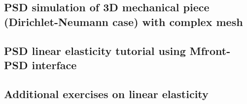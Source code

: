 {
	\renewcommand{\subsection}{\subsubsection}
	
}


\subsection{PSD simulation of 3D  mechanical piece (Dirichlet-Neumann case) with complex mesh\label{sec:3d-bar-clamped3-sub}}

{
	\renewcommand{\subsection}{\subsubsection}
	
}


\subsection{PSD linear elasticity tutorial using Mfront-PSD interface\label{sec:2d-mfront}}

{
\renewcommand{\subsection}{\subsubsection}

}


\subsection{Additional exercises on linear elasticity}
{
	\renewcommand{\subsection}{\subsubsection}
	
}

